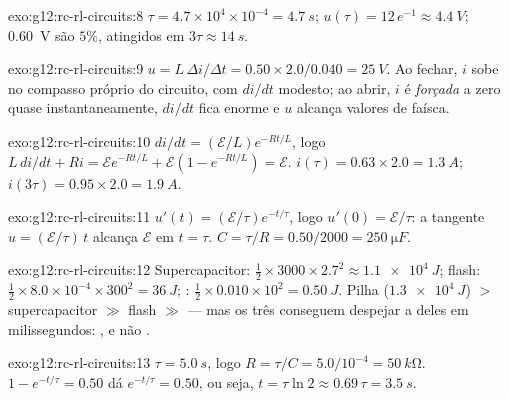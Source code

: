 \begin{solution}{exo:g12:rc-rl-circuits:8}
$\tau = 4.7\times10^{4} \times 10^{-4} = \qty{4.7}{s}$;
$u(\tau) = 12\,e^{-1} \approx \qty{4.4}{V}$; \qty{0.60}{V} são $5\%$,
atingidos em $3\tau \approx \qty{14}{s}$.
\end{solution}

\begin{solution}{exo:g12:rc-rl-circuits:9}
$u = L\,\Delta i/\Delta t = 0.50 \times 2.0/0.040 = \qty{25}{V}$. Ao
fechar, $i$ sobe no compasso próprio do circuito, com $di/dt$ modesto; ao
abrir, $i$ é \emph{forçada} a zero quase instantaneamente, $di/dt$ fica
enorme e $u$ alcança valores de faísca.
\end{solution}

\begin{solution}{exo:g12:rc-rl-circuits:10}
$di/dt = (\mathcal{E}/L)e^{-Rt/L}$, logo
$L\,di/dt + Ri = \mathcal{E}e^{-Rt/L} + \mathcal{E}(1 - e^{-Rt/L}) =
\mathcal{E}$. $i(\tau) = 0.63 \times 2.0 = \qty{1.3}{A}$;
$i(3\tau) = 0.95 \times 2.0 = \qty{1.9}{A}$.
\end{solution}

\begin{solution}{exo:g12:rc-rl-circuits:11}
$u'(t) = (\mathcal{E}/\tau)e^{-t/\tau}$, logo
$u'(0) = \mathcal{E}/\tau$: a tangente $u = (\mathcal{E}/\tau)\,t$
alcança $\mathcal{E}$ em $t = \tau$.
$C = \tau/R = 0.50/2000 = \qty{250}{\micro F}$.
\end{solution}

\begin{solution}{exo:g12:rc-rl-circuits:12}
Supercapacitor: $\tfrac12 \times 3000 \times 2.7^2 \approx
\qty{1.1e4}{J}$; flash:
$\tfrac12 \times 8.0\times10^{-4} \times 300^2 = \qty{36}{J}$; :
$\tfrac12 \times 0.010 \times 10^2 = \qty{0.50}{J}$. Pilha
($\qty{1.3e4}{J}$) $>$ supercapacitor $\gg$ flash $\gg$  --- mas os
três conseguem despejar a  deles em milissegundos: , e
não .
\end{solution}

\begin{solution}{exo:g12:rc-rl-circuits:13}
$\tau = \qty{5.0}{s}$, logo $R = \tau/C = 5.0/10^{-4} = \qty{50}{k\ohm}$.
$1 - e^{-t/\tau} = 0.50$ dá $e^{-t/\tau} = 0.50$, ou seja,
$t = \tau\ln 2 \approx 0.69\,\tau = \qty{3.5}{s}$.
\end{solution}

